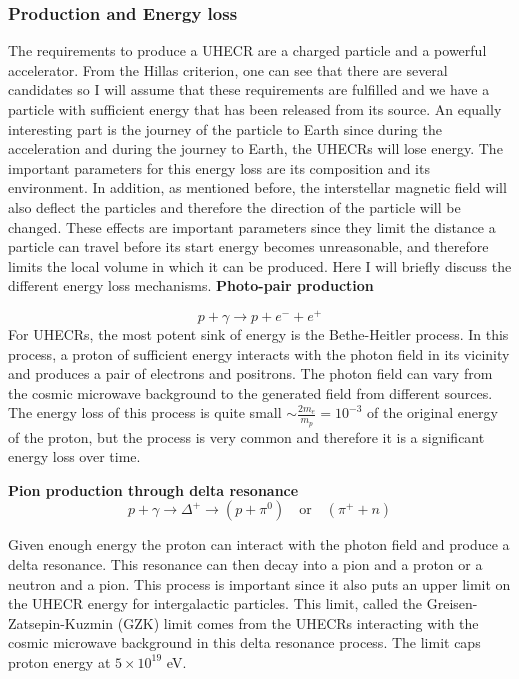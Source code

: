 \documentclass{article}
\begin{document}
\subsubsection{Production and Energy loss}
The requirements to produce a UHECR are a charged particle and a powerful accelerator. From the Hillas criterion, one can see that there are several candidates so I will assume that these requirements are fulfilled and we have a particle with sufficient energy that has been released from its source.
An equally interesting part is the journey of the particle to Earth since during the acceleration and during the journey to Earth, the UHECRs will lose energy. The important parameters for this energy loss are its composition and its environment. In addition, as mentioned before, the interstellar magnetic field will also deflect the particles and therefore the direction of the particle will be changed. These effects are important parameters since they limit the 
distance a particle can travel before its start energy becomes unreasonable, and therefore limits the local volume in which it can be produced. 
Here I will briefly discuss the different energy loss mechanisms. 
\textbf{Photo-pair production}

\begin{equation}
    p + \gamma \rightarrow p + e^- + e^+
\end{equation}
For UHECRs, the most potent sink of energy is the Bethe-Heitler process. In this process, a proton of sufficient energy interacts with the 
photon field in its vicinity and produces a pair of electrons and positrons. The photon field can vary from the cosmic microwave background to the generated field from different sources. 
The energy loss of this process is quite small $\sim \frac{2m_e}{m_p}= 10^{-3}$ of the original energy of the proton, but the process is very common and therefore it is a significant energy loss over time.


\textbf{Pion production through delta resonance}
\begin{equation}
    p + \gamma \rightarrow \Delta^+ \rightarrow (p + \pi^0)\quad \text{or} \quad (\pi^+ + n)
    \label{eq:delta_resonance}
\end{equation}

Given enough energy the proton can interact with the photon field and produce a delta resonance. This resonance can then decay into a pion and a proton or a neutron and a pion. 
This process is important since it also puts an upper limit on the UHECR energy for intergalactic particles. 
This limit, called the Greisen-Zatsepin-Kuzmin (GZK) limit comes from the UHECRs interacting with the cosmic microwave background in this delta resonance process. The limit caps proton energy at $5\times 10^{19}$ eV.
\end{document}
